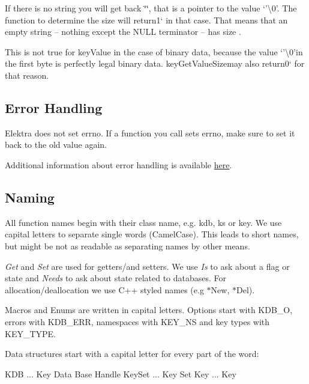 If there is no string you will get back {\ttfamily \char`\"{}\char`\"{}}, that is a pointer to the value `'\textbackslash{}0'{\ttfamily . The function to determine the size will return}1` in that case. That means that an empty string – nothing except the N\+U\+L\+L terminator – has size {}.

This is not true for {\ttfamily key\+Value} in the case of binary data, because the value `'\textbackslash{}0'{\ttfamily in the first byte is perfectly legal binary data. }key\+Get\+Value\+Size{\ttfamily may also return}0` for that reason.

\subsection*{Error Handling}

Elektra does not set {\ttfamily errno}. If a function you call sets {\ttfamily errno}, make sure to set it back to the old value again.

Additional information about error handling is available \hyperlink{md_doc_help_elektra-error-handling_doc_help_elektra-error-handling_md}{here}.

\subsection*{Naming}

All function names begin with their class name, e.\+g. {\ttfamily kdb}, {\ttfamily ks} or {\ttfamily key}. We use capital letters to separate single words (Camel\+Case). This leads to short names, but might be not as readable as separating names by other means.

{\itshape Get} and {\itshape Set} are used for getters/and setters. We use {\itshape Is} to ask about a flag or state and {\itshape Needs} to ask about state related to databases. For allocation/deallocation we use C++ styled names (e.\+g $\ast$\+New, $\ast$\+Del).

Macros and Enums are written in capital letters. Options start with {\ttfamily K\+D\+B\+\_\+\+O}, errors with {\ttfamily K\+D\+B\+\_\+\+E\+R\+R}, namespaces with {\ttfamily K\+E\+Y\+\_\+\+N\+S} and key types with {\ttfamily K\+E\+Y\+\_\+\+T\+Y\+P\+E}.

Data structures start with a capital letter for every part of the word\+: \begin{DoxyVerb}    KDB ... Key Data Base Handle
    KeySet ... Key Set
    Key ... Key
\end{DoxyVerb}


